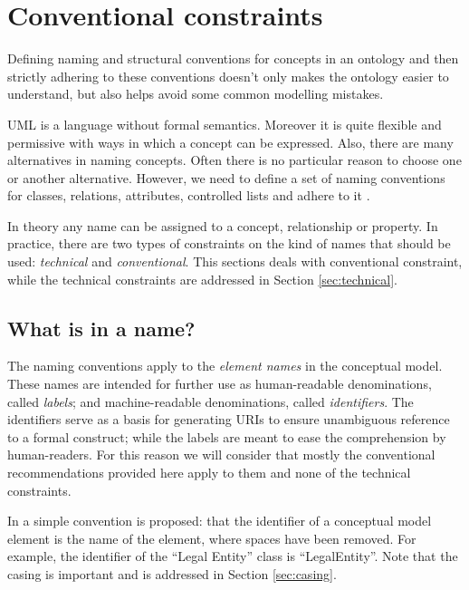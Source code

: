 \section{Conventional constraints}
\label{sec:conventional}

	Defining naming and structural conventions for concepts in an ontology and then strictly adhering to these conventions doesn't only makes the ontology easier to understand, but also helps avoid some common modelling mistakes. 
	
	UML is a language without formal semantics. Moreover it is quite flexible and permissive with ways in which a concept can be expressed. Also, there are many alternatives in naming concepts. Often there is no particular reason to choose one or another alternative. However, we need to define a set of naming conventions for classes, relations, attributes, controlled lists and adhere to it \cite{noy2001}.

	In theory any name can be assigned to a concept, relationship or property. In practice, there are two types of constraints on the kind of names that should be used: \textit{technical} and \textit{conventional}. This sections deals with conventional constraint, while the technical constraints are addressed in Section \ref{sec:technical}.
	
	\subsection{What is in a name?}
	\label{sec:name}
		
	The naming conventions apply to the \textit{element names} in the conceptual model. These names are intended for further use as human-readable denominations, called \textit{labels}; and machine-readable denominations, called \textit{identifiers}. The identifiers serve as a basis for generating URIs \cite{rfc3986} to ensure unambiguous reference to a formal construct; while the labels are meant to ease the comprehension by human-readers. For this reason we will consider that mostly the conventional recommendations provided here apply to them and none of the technical constraints.
	
	In \cite{isaHandbook2015} a simple convention is proposed: that the identifier of a conceptual model element is the name of the element, where spaces have been removed. For example, the identifier of the ``Legal Entity'' class is ``LegalEntity''. Note that the casing is important and is addressed in Section \ref{sec:casing}.
	
